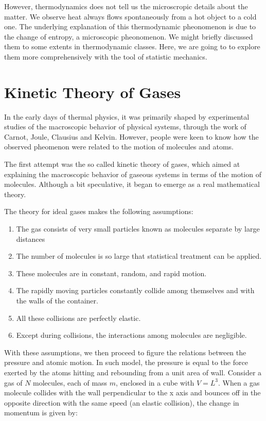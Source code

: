 \documentclass[twoside]{article}
\begin{document}
However, thermodynamics does not tell us the microscropic details about the matter. 
We observe heat always flows spontaneously from a hot object to a cold one. 
The underlying explanation of this thermodynamic pheonomenon is due to the change of entropy, a microscopic pheonomenon.
We might briefly discussed them to some extents in thermodynamic classes.
Here, we are going to to explore them more comprehensively with the tool of statistic mechanics.

\section{Kinetic Theory of Gases}
In the early days of thermal physics, it was primarily shaped by experimental studies of the macroscopic behavior of physical systems, through the work of Carnot, Joule, Clausius and Kelvin. However, people were keen to know how the observed pheomenon were related to the motion of molecules and atoms.

The first attempt was the so called kinetic theory of gases, which aimed at explaining the macroscopic behavior of gaseous systems in terms of the motion of molecules. Although a bit speculative, it began to emerge as a real mathematical theory. 

The theory for ideal gases makes the following assumptions:
\begin{enumerate}
	\item The gas consists of very small particles known as molecules separate by large distances
	\item The number of molecules is so large that statistical treatment can be applied.
	\item These molecules are in constant, random, and rapid motion.
	\item The rapidly moving particles constantly collide among themselves and with the walls of the container. 
	\item All these collisions are perfectly elastic. 
	\item Except during collisions, the interactions among molecules are negligible. 
\end{enumerate}	
With these assumptions, we then proceed to figure the relations between the pressure and atomic motion. In such model, the pressure is equal to the force exerted by the atoms hitting and rebounding from a unit area of wall. Consider a gas of $N$ molecules, each of mass $m$, enclosed in a cube with $V = L^3$. When a gas molecule collides with the wall perpendicular to the x axis and bounces off in the opposite direction with the same speed (an elastic collision), the change in momentum is given by:
\end{document}
